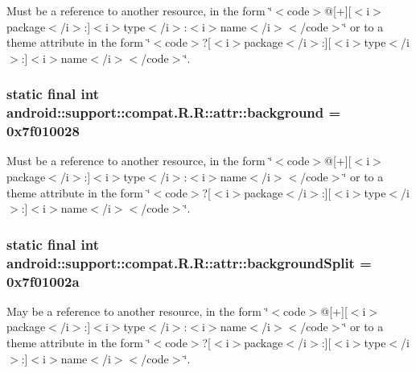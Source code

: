 Must be a reference to another resource, in the form \char`\"{}$<$code$>$@\mbox{[}+\mbox{]}\mbox{[}$<$i$>$package$<$/i$>$:\mbox{]}$<$i$>$type$<$/i$>$:$<$i$>$name$<$/i$>$$<$/code$>$\char`\"{} or to a theme attribute in the form \char`\"{}$<$code$>$?\mbox{[}$<$i$>$package$<$/i$>$:\mbox{]}\mbox{[}$<$i$>$type$<$/i$>$:\mbox{]}$<$i$>$name$<$/i$>$$<$/code$>$\char`\"{}. \hypertarget{classandroid_1_1support_1_1compat_1_1_r_1_1attr_3d10b5c04ef6994b82b5251e42591c9e}{
\subsubsection[{background}]{\setlength{\rightskip}{0pt plus 5cm}static final int android::support::compat.R.R::attr::background = 0x7f010028}}
\label{classandroid_1_1support_1_1compat_1_1_r_1_1attr_3d10b5c04ef6994b82b5251e42591c9e}


Must be a reference to another resource, in the form \char`\"{}$<$code$>$@\mbox{[}+\mbox{]}\mbox{[}$<$i$>$package$<$/i$>$:\mbox{]}$<$i$>$type$<$/i$>$:$<$i$>$name$<$/i$>$$<$/code$>$\char`\"{} or to a theme attribute in the form \char`\"{}$<$code$>$?\mbox{[}$<$i$>$package$<$/i$>$:\mbox{]}\mbox{[}$<$i$>$type$<$/i$>$:\mbox{]}$<$i$>$name$<$/i$>$$<$/code$>$\char`\"{}. \hypertarget{classandroid_1_1support_1_1compat_1_1_r_1_1attr_b00ef69517667cd9529d125ea102b4b6}{
\subsubsection[{backgroundSplit}]{\setlength{\rightskip}{0pt plus 5cm}static final int android::support::compat.R.R::attr::backgroundSplit = 0x7f01002a}}
\label{classandroid_1_1support_1_1compat_1_1_r_1_1attr_b00ef69517667cd9529d125ea102b4b6}


May be a reference to another resource, in the form \char`\"{}$<$code$>$@\mbox{[}+\mbox{]}\mbox{[}$<$i$>$package$<$/i$>$:\mbox{]}$<$i$>$type$<$/i$>$:$<$i$>$name$<$/i$>$$<$/code$>$\char`\"{} or to a theme attribute in the form \char`\"{}$<$code$>$?\mbox{[}$<$i$>$package$<$/i$>$:\mbox{]}\mbox{[}$<$i$>$type$<$/i$>$:\mbox{]}$<$i$>$name$<$/i$>$$<$/code$>$\char`\"{}. 

